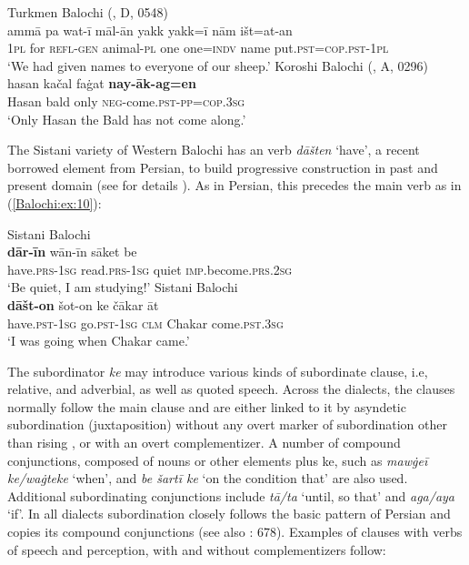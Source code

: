 \documentclass[output=paper,colorlinks,citecolor=brown,draftmode]{langscibook}
\begin{document}
\ea\label{Balochi:ex:9}
\ea\label{Balochi:ex:9a}
Turkmen Balochi (\citealt{haig_balochi_2022}, D, 0548)\\
\gll ammā pa wat-ī māl-ān yakk yakk=ī nām išt=at-an \\
\textsc{1pl} for \textsc{refl}-\textsc{gen} animal-\textsc{pl} one one=\textsc{indv} name put.\textsc{pst}=\textsc{cop}.\textsc{pst}-\textsc{1pl} \\
\glt `We had given names to everyone of our sheep.'
\ex\label{Balochi:ex:9b}
Koroshi Balochi (\citealt{nourzaei_balochi_koroshi_2021}, A, 0296)\\
\gll hasan kačal faġat \textbf{nay-āk-ag=en} \\
Hasan bald only \textsc{neg}-come.\textsc{pst}-\textsc{pp}=\textsc{cop}.\textsc{3sg} \\
\glt `Only Hasan the Bald has not come along.'
\z
\z


The Sistani variety of Western Balochi has an  verb \textit{dāšten} `have', a recent borrowed element from Persian, to build progressive construction in past and present domain (see for details \citealt{nourzaei_progressive_nodate}). As in Persian, this  precedes the main verb as in (\ref{Balochi:ex:10}): 

\ea\label{Balochi:ex:10}
\ea\label{Balochi:ex:10a}
Sistani Balochi \citep{nourzaei_progressive_nodate}\\
\gll \textbf{dār-īn} wān-īn sāket be \\
have.\textsc{prs}-\textsc{1sg} read.\textsc{prs}-\textsc{1sg} quiet \textsc{imp}.become.\textsc{prs}.\textsc{2sg} \\
\glt `{B}e quiet, I am studying!'
\ex\label{Balochi:ex:10b}
Sistani Balochi \citep{nourzaei_progressive_nodate}\\
\gll \textbf{dāšt-on} šot-on ke čākar āt \\
have.\textsc{pst}-\textsc{1sg} go.\textsc{pst}-\textsc{1sg} \textsc{clm} Chakar come.\textsc{pst}.\textsc{3sg} \\
\glt `I was going when Chakar came.'
\z
\z

The subordinator \textit{ke} may introduce various kinds of subordinate clause, i.e, relative,  and adverbial, as well as quoted speech. Across the dialects, the  clauses normally follow the main clause and are either linked to it by asyndetic subordination (juxtaposition) without any overt marker of subordination other than rising , or with an overt complementizer. A number of compound conjunctions, composed of nouns or other elements plus ke, such as \textit{mawġeī ke/waġteke} `when', and \textit{be šartī ke} `on the condition that' are also used. Additional subordinating conjunctions include \textit{tā/ta} `until, so that' and \textit{aga/aya} `if'. In all dialects subordination closely follows the basic pattern of Persian and copies its compound conjunctions (see also \citealt{jahani_balochi_2009}: 678). Examples of  clauses with verbs of speech and perception, with and without complementizers follow:
\end{document}
